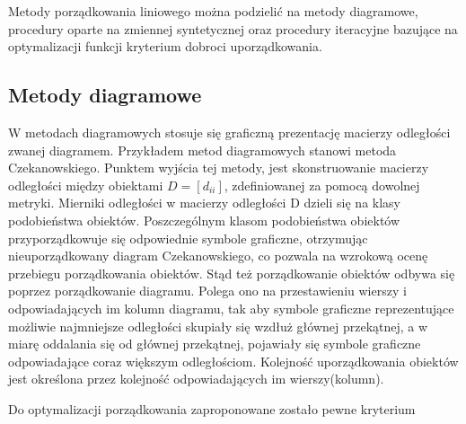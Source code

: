 \documentclass[12pt,a4paper]{report}
\begin{document}
Metody porządkowania liniowego można podzielić na metody diagramowe, procedury oparte na zmiennej syntetycznej oraz procedury iteracyjne bazujące na optymalizacji funkcji kryterium dobroci uporządkowania.

\newpage
\subsection{Metody diagramowe}
\noindent

W metodach diagramowych stosuje się graficzną prezentację macierzy odległości zwanej diagramem. Przykładem metod diagramowych stanowi metoda Czekanowskiego. Punktem wyjścia tej metody, jest skonstruowanie macierzy odległości między obiektami $D=[d_{ii}]$, zdefiniowanej za pomocą dowolnej metryki. Mierniki odległości w macierzy odległości D dzieli się na klasy podobieństwa obiektów. Poszczególnym klasom podobieństwa obiektów przyporządkowuje się odpowiednie symbole graficzne, otrzymując nieuporządkowany diagram Czekanowskiego, co pozwala na wzrokową ocenę przebiegu porządkowania obiektów. Stąd też porządkowanie obiektów odbywa się poprzez porządkowanie diagramu. Polega ono na przestawieniu wierszy i odpowiadających im kolumn diagramu, tak aby symbole graficzne reprezentujące możliwie najmniejsze odległości skupiały się wzdłuż głównej przekątnej, a w miarę oddalania się od głównej przekątnej, pojawiały się symbole graficzne odpowiadające coraz większym odległościom. Kolejność uporządkowania obiektów jest określona przez kolejność odpowiadających im wierszy(kolumn).

Do optymalizacji porządkowania zaproponowane zostało pewne kryterium
\end{document}
